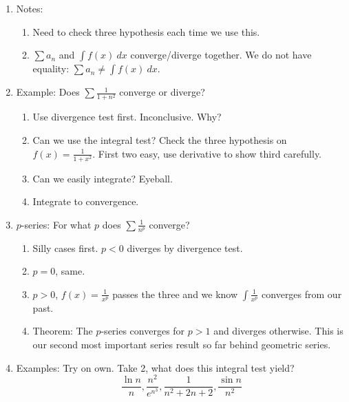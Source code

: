 \documentclass{article}
\begin{document}
\begin{enumerate}
\item Notes:
\begin{enumerate}
\item Need to check three hypothesis each time we use this.
\item $\sum a_n$ and $\int f(x)~dx$ converge/diverge together. We do not have equality: $\sum a_n \neq \int f(x)~dx$.
\end{enumerate}

\item Example: Does $\sum \frac{1}{1+n^2}$ converge or diverge?
\begin{enumerate}
\item Use divergence test first. Inconclusive. Why?
\item Can we use the integral test? Check the three hypothesis on $f(x)  = \frac{1}{1+x^2}$. First two easy, use derivative to show third carefully.
\item Can we easily integrate? Eyeball.
\item Integrate to convergence.
\end{enumerate} 

\item $p$-series: For what $p$ does $\sum \frac{1}{n^p}$ converge?
\begin{enumerate}
\item Silly cases first. $p<0$ diverges by divergence test.
\item $p=0$, same.
\item $p>0$, $f(x)=\frac{1}{x^p}$ passes the three and we know $\int \frac{1}{x^p}$ converges from our past. 
\item Theorem: The $p$-series converges for $p>1$ and diverges otherwise. This is our second most important series result so far behind geometric series.
\end{enumerate} 

\item Examples: Try on own. Take 2, what does this integral test yield?
$$
\frac{\ln n}{n}, \frac{n^2}{e^{n^3}}, \frac{1}{n^2+2n+2}, \frac{\sin n}{n^2}
$$


\end{enumerate}
\end{document}

